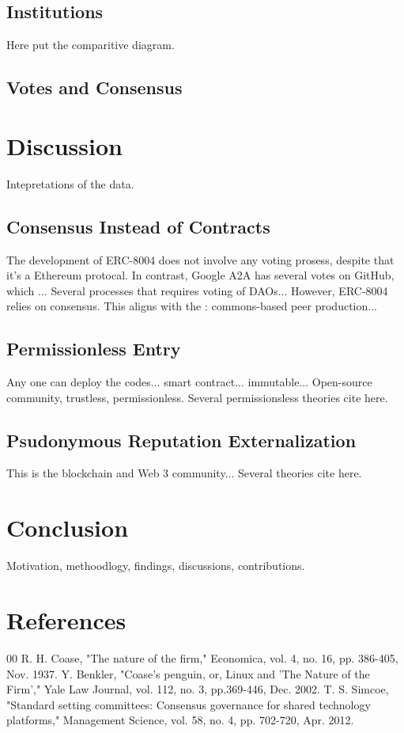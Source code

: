 \documentclass[conference]{IEEEtran}
\begin{document}
\subsection{Institutions}
Here put the comparitive diagram.
\subsection{Votes and Consensus}

\section{Discussion}

Intepretations of the data. 

\subsection{Consensus Instead of Contracts}
The development of ERC-8004 does not involve any voting prosess, despite that it's a Ethereum protocal. In contrast, Google A2A has several votes on GitHub, which ... Several processes that requires voting of DAOs... However, ERC-8004 relies on consensus. This aligns with the \cite{Benkler}: commons-based peer production... 

\subsection{Permissionless Entry}
Any one can deploy the codes... smart contract... immutable... 
Open-source community, trustless, permissionless. Several permissionsless theories cite here. 

\subsection{Psudonymous Reputation Externalization}
This is the blockchain and Web 3 community... Several theories cite here. 

\section{Conclusion}
Motivation, methoodlogy, findings, discussions, contributions. 

\section*{References}
\begin{thebibliography}{00}
 R. H. Coase, "The nature of the firm," Economica, vol. 4, no. 16, pp. 386-405, Nov. 1937.
 Y. Benkler, "Coase's penguin, or, Linux and 'The Nature of the Firm'," Yale Law Journal, vol. 112, no. 3, pp.369-446, Dec. 2002.
 T. S. Simcoe, "Standard setting committees: Consensus governance for shared technology platforms," Management Science, vol. 58, no. 4, pp. 702-720, Apr. 2012.
\end{thebibliography}
\vspace{12pt}
\end{document}
